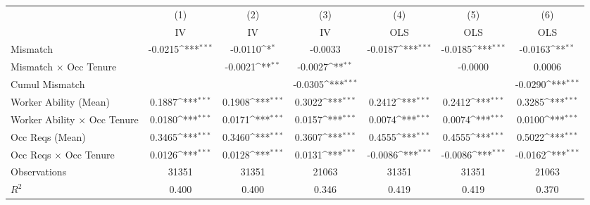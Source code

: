 {
\def\sym#1{\ifmmode^{#1}\else\(^{#1}\)\fi}
\begin{tabular}{l*{6}{c}}
\hline  
                    &\multicolumn{1}{c}{(1)}&\multicolumn{1}{c}{(2)}&\multicolumn{1}{c}{(3)}&\multicolumn{1}{c}{(4)}&\multicolumn{1}{c}{(5)}&\multicolumn{1}{c}{(6)}\\
                    &\multicolumn{1}{c}{IV}&\multicolumn{1}{c}{IV}&\multicolumn{1}{c}{IV}&\multicolumn{1}{c}{OLS}&\multicolumn{1}{c}{OLS}&\multicolumn{1}{c}{OLS}\\
\hline  
Mismatch            &     -0.0215\sym{***}&     -0.0110\sym{*}  &     -0.0033         &     -0.0187\sym{***}&     -0.0185\sym{***}&     -0.0163\sym{**} \\
[1em]
Mismatch $\times$ Occ Tenure&                     &     -0.0021\sym{**} &     -0.0027\sym{**} &                     &     -0.0000         &      0.0006         \\
[1em]
Cumul Mismatch      &                     &                     &     -0.0305\sym{***}&                     &                     &     -0.0290\sym{***}\\
[1em]
Worker Ability (Mean)&      0.1887\sym{***}&      0.1908\sym{***}&      0.3022\sym{***}&      0.2412\sym{***}&      0.2412\sym{***}&      0.3285\sym{***}\\
[1em]
Worker Ability $\times$ Occ Tenure&      0.0180\sym{***}&      0.0171\sym{***}&      0.0157\sym{***}&      0.0074\sym{***}&      0.0074\sym{***}&      0.0100\sym{***}\\
[1em]
Occ Reqs (Mean)     &      0.3465\sym{***}&      0.3460\sym{***}&      0.3607\sym{***}&      0.4555\sym{***}&      0.4555\sym{***}&      0.5022\sym{***}\\
[1em]
Occ Reqs $\times$ Occ Tenure&      0.0126\sym{***}&      0.0128\sym{***}&      0.0131\sym{***}&     -0.0086\sym{***}&     -0.0086\sym{***}&     -0.0162\sym{***}\\
\hline  
Observations        &       31351         &       31351         &       21063         &       31351         &       31351         &       21063         \\
\(R^{2}\)           &       0.400         &       0.400         &       0.346         &       0.419         &       0.419         &       0.370         \\
\hline  
\end{tabular}
}
